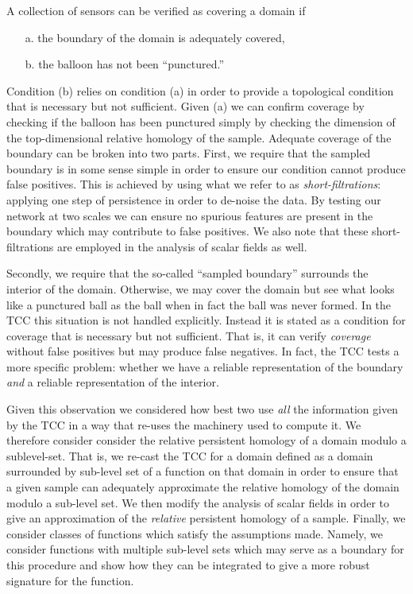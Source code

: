 A collection of sensors can be verified as covering a domain if
\begin{enumerate}
    \item[a.] the boundary of the domain is adequately covered,
    \item[b.] the balloon has not been ``punctured.''
\end{enumerate}
Condition (b) relies on condition (a) in order to provide a topological condition that is necessary but not sufficient.
Given (a) we can confirm coverage by checking if the balloon has been punctured simply by checking the dimension of the top-dimensional relative homology of the sample.
Adequate coverage of the boundary can be broken into two parts.
First, we require that the sampled boundary is in some sense simple in order to ensure our condition cannot produce false positives.
This is achieved by using what we refer to as \emph{short-filtrations}: applying one step of persistence in order to de-noise the data.
By testing our network at two scales we can ensure no spurious features are present in the boundary which may contribute to false positives.
We also note that these short-filtrations are employed in the analysis of scalar fields as well.

Secondly, we require that the so-called ``sampled boundary'' surrounds the interior of the domain.
Otherwise, we may cover the domain but see what looks like a punctured ball as the ball when in fact the ball was never formed.
In the TCC this situation is not handled explicitly.
Instead it is stated as a condition for coverage that is necessary but not sufficient.
That is, it can verify \emph{coverage} without false positives but may produce false negatives.
In fact, the TCC tests a more specific problem: whether we have a reliable representation of the boundary \emph{and} a reliable representation of the interior.

Given this observation we considered how best two use \emph{all} the information given by the TCC in a way that re-uses the machinery used to compute it.
We therefore consider consider the relative persistent homology of a domain modulo a sublevel-set.
That is, we re-cast the TCC for a domain defined as a domain surrounded by sub-level set of a function on that domain in order to ensure that a given sample can adequately approximate the relative homology of the domain modulo a sub-level set.
We then modify the analysis of scalar fields in order to give an approximation of the \emph{relative} persistent homology of a sample.
Finally, we consider classes of functions which satisfy the assumptions made.
Namely, we consider functions with multiple sub-level sets which may serve as a boundary for this procedure and show how they can be integrated to give a more robust signature for the function.
